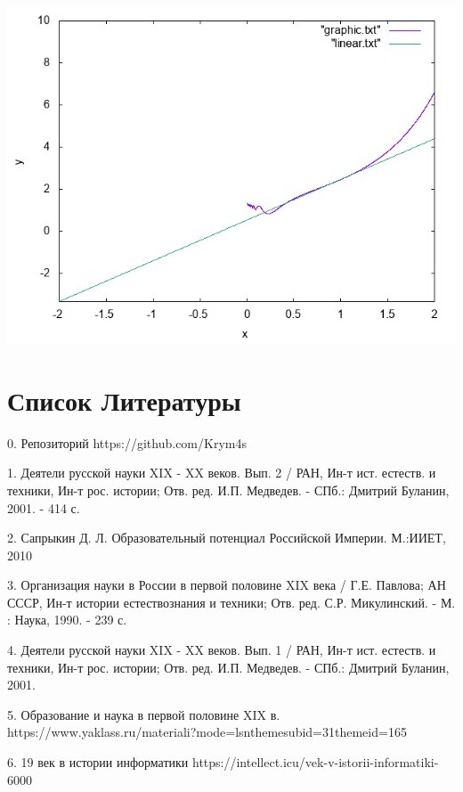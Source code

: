 \documentclass[a4paper,12pt]{article}
\begin{document}
\includegraphics{graphic.png}\section{Список Литературы}

0. Репозиторий https://github.com/Krym4s

1. Деятели русской науки XIX - XX веков. Вып. 2 / РАН, Ин-т ист. естеств. и техники, Ин-т рос. истории; Отв. ред. И.П. Медведев. - СПб.: Дмитрий Буланин, 2001. - 414 с.

2. Сапрыкин Д. Л. Образовательный потенциал Российской Империи. М.:ИИЕТ, 2010

3. Организация науки в России в первой половине XIX века / Г.Е. Павлова; АН СССР, Ин-т истории естествознания и техники; Отв. ред. С.Р. Микулинский. - М. : Наука, 1990. - 239 с.

4. Деятели русской науки XIX - XX веков. Вып. 1 / РАН, Ин-т ист. естеств. и техники, Ин-т рос. истории; Отв. ред. И.П. Медведев. - СПб.: Дмитрий Буланин, 2001.

5. Образование и наука в первой половине XIX в. https://www.yaklass.ru/materiali?mode=lsnthemesubid=31themeid=165

6. 19 век в истории информатики https://intellect.icu/vek-v-istorii-informatiki-  6000
\end{document}
